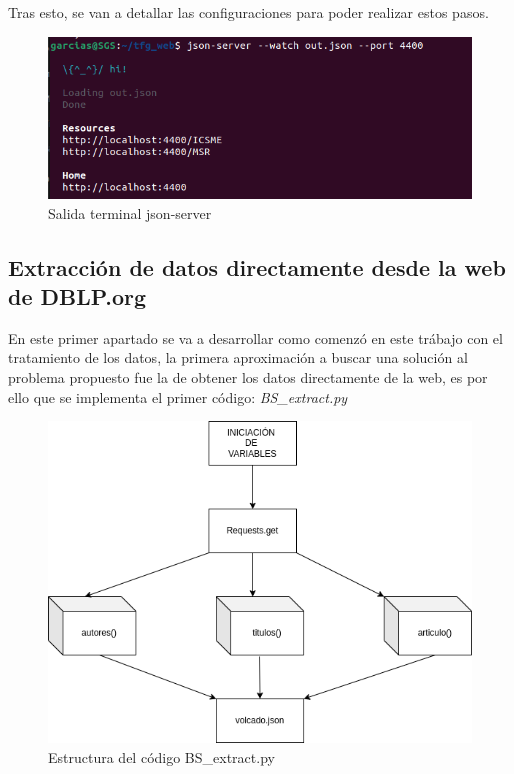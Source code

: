 \documentclass[a4paper, 12pt]{book}
\begin{document}
Tras esto, se van a detallar las configuraciones para poder realizar estos pasos.

\begin{figure}[h]
  \centering
  \includegraphics[width=15cm, keepaspectratio]{img/terminal_json_server.png}
  \caption{Salida terminal json-server}
  \label{fig:json_server}
\end{figure}

\subsection{Extracción de datos directamente desde la web de DBLP.org}

En este primer apartado se va a desarrollar como comenzó en este trábajo con el tratamiento de los datos, la primera aproximación a buscar una solución al problema propuesto fue la de obtener los datos directamente de la web, es por ello que se implementa el primer código: \textit{BS\_extract.py}

\begin{figure}[h]
  \centering
  \includegraphics[width=12cm, keepaspectratio]{img/BS_extract_graph.png}
  \caption{Estructura del código BS\_extract.py}
  \label{fig:bs_extract}
\end{figure}
\end{document}

